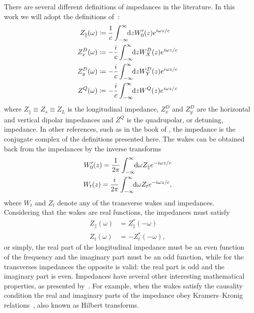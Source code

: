     There are several different definitions of impedances in the literature. In this work we will adopt the definitions of~:
    \begin{align}\label{eq:impedances_definition}
        \begin{aligned}
      	  	Z_\parallel(\omega) &\coloneqq \frac1c \infint{z}{W'_0(z)e^{i\omega z/c}}\\
          	Z^D_x(\omega) &\coloneqq -\frac{i}{c} \infint{z}{W^D_X(z)e^{i\omega z/c}}\\
          	Z^D_y(\omega) &\coloneqq -\frac{i}{c} \infint{z}{W^D_Y(z)e^{i\omega z/c}}\\
          	Z^Q(\omega) &\coloneqq -\frac{i}{c} \infint{z}{W^Q(z)e^{i\omega z/c}}
        \end{aligned}
    \end{align}
    where $Z_\parallel \equiv Z_s \equiv Z_L$ is the longitudinal impedance, $Z^D_x$ and $Z^D_y$ are the horizontal and vertical dipolar impedances and $Z^Q$ is the quadrupolar, or detuning, impedance. In other references, such as in the book of , the impedance is the conjugate complex of the definitions presented here. The wakes can be obtained back from the impedances by the inverse transforms
    \begin{align}\label{eq:wake_as_impedance}
	  	\begin{aligned}
            W'_0(z) = \frac{1}{2\pi}\int_{-\infty}^{\infty}\!\!\text{d}\omega Z_\parallel e^{-i\omega z/c}\\
            W_t(z) = \frac{i}{2\pi}\int_{-\infty}^{\infty}\!\!\text{d}\omega Z_t e^{-i\omega z/c},
        \end{aligned}
    \end{align}
    where $W_t$ and $Z_t$ denote any of the transverse wakes and impedances. Considering that the wakes are real functions, the impedances must satisfy
    \begin{subequations}\label{eq:impedance_even_odd}
    \begin{align}\label{eq:impedance_even_odd_long}
  	  	Z_\parallel(\omega) &= Z_\parallel^*(-\omega)\\\label{eq:impedance_even_odd_trans}
	  	Z_t(\omega) &= -Z_t^*(-\omega),
    \end{align}
    \end{subequations}
    or simply, the real part of the longitudinal impedance must be an even function of the frequency and the imaginary part must be an odd function, while for the transverses impedances the opposite is valid: the real part is odd and the imaginary part is even. Impedances have several other interesting mathematical properties, as presented by~. For example, when the wakes satisfy the causality condition the real and imaginary parts of the impedance obey Kramers--Kronig relations~\cite{Kronig1926}, also known as Hilbert transforms.

